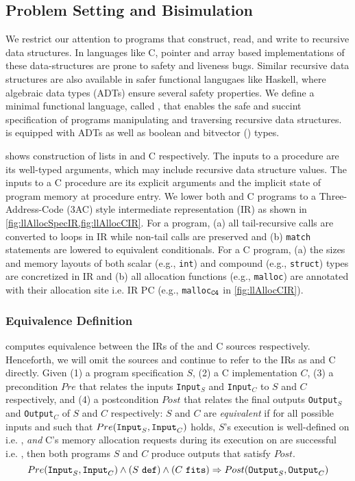 \subsection{Problem Setting and Bisimulation}
\label{sec:syn-setting-bisimulation}
We restrict our attention to programs that construct, read, and write
to recursive data structures. In languages like C, pointer and array based
implementations of these data-structures are prone to safety and liveness bugs.
Similar recursive data structures are also available in safer functional langugaes like Haskell,
where algebraic data types (ADTs) \cite{hope} ensure several safety properties.
We define a minimal functional language, called \SpecL{}, that enables the safe
and succint specification of programs manipulating and traversing recursive data structures.
\SpecL{} is equipped with ADTs as well as boolean and bitvector () types.



 shows construction of lists in \SpecL{} and C respectively.
The inputs to a \SpecL{} procedure are its well-typed arguments, which may include recursive data structure
values. The inputs to a C procedure are its explicit arguments and the implicit state of program memory
at procedure entry. We lower both \SpecL{} and C programs to a
Three-Address-Code (3AC) style intermediate representation (IR)
as shown in \cref{fig:llAllocSpecIR,fig:llAllocCIR}. For a \SpecL{} program,
(a) all tail-recursive calls are converted to loops in IR while non-tail calls are preserved and
(b) {\tt match} statements are lowered to equivalent \sumDtor{} conditionals.
For a C program, (a) the sizes and memory layouts of both scalar (e.g., {\tt int})
and compound (e.g., {\tt struct}) types are concretized in IR and
(b) all allocation functions (e.g., {\tt malloc}) are annotated with their
allocation site i.e. IR PC (e.g., {\tt malloc$_{\tt C4}$} in \cref{fig:llAllocCIR}).

\subsubsection{Equivalence Definition}
\label{sec:syn-equivalence}
\toolName{} computes equivalence between the IRs of the \SpecL{} and C sources respectively.
Henceforth, we will omit the sources and continue to refer to the IRs as \SpecL{} and C directly.
Given (1) a \SpecL{} program specification $S$, (2) a C implementation $C$,
(3) a precondition $Pre$ that relates the inputs {\tt Input}$_S$ and {\tt Input}$_C$ to $S$ and $C$
respectively, and (4) a postcondition $Post$ that relates the final outputs {\tt Output}$_S$
and {\tt Output}$_C$ of $S$ and $C$ respectively:
$S$ and $C$ are {\em equivalent} if for all possible inputs  and  such that
$Pre({\tt Input}_{S},{\tt Input}_{C})$ holds,
$S$'s execution is well-defined on  i.e. \sdef{}, {\em and} C's
memory allocation requests during its execution on  are successful i.e. \cfits{},
then both programs $S$ and $C$ produce outputs
that satisfy $Post$.
$$
Pre({\tt Input}_{S},{\tt Input}_{C}) \land {(S\ {\tt def})}{} \land {(C\ {\tt fits})}{} \Rightarrow Post({\tt Output}_{S},{\tt Output}_{C})
$$

